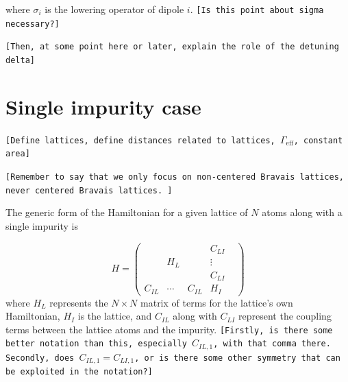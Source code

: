 \documentclass[aps,pra,superscriptaddress,twocolumn]{revtex4-1}
\newcommand{\commentSB}[1]{\texttt{\color{blue}[#1]}}
\newcommand{\commentSO}[1]{\texttt{\color{orange}[#1]}}
\newcommand{\commentTP}[1]{\texttt{\color{green}[#1]}}
\begin{document}
where $\sigma_i$ is the lowering operator of dipole $i$. 
\commentSB{Is this point about sigma necessary?}

\commentSB{Then, at some point here or later, explain the role of the detuning delta}

\section{Single impurity case}
\commentSO{Define lattices, define distances related to lattices, $\Gamma_\mathrm{eff}$, constant area}

\commentTP{Remember to say that we only focus on non-centered Bravais lattices, never centered Bravais lattices. }


The generic form of the Hamiltonian for a given lattice of $N$ atoms along with a single impurity is 

\begin{equation}
    H = \begin{pmatrix}
        ~ & ~ & ~ &   C_{LI} \\ 
        ~ & H_L & ~ & \vdots \\
        ~ & ~ & ~ & C_{LI} & \\
        C_{IL} & \cdots & C_{IL} & H_I   
    \end{pmatrix}
    \label{eqn:blockH1}
\end{equation}
where $H_L$ represents the $N \times N$ matrix of terms for the lattice's own Hamiltonian, $H_I$ is the lattice, and $C_{IL}$ along with $C_{LI}$ represent the coupling terms between the lattice atoms and the impurity. 
\commentSB{Firstly, is there some better notation than this, especially $C_{IL,1}$, with that comma there. Secondly, does $C_{IL,1} = C_{LI,1}$, or is there some other symmetry that can be exploited in the notation?}
\end{document}
